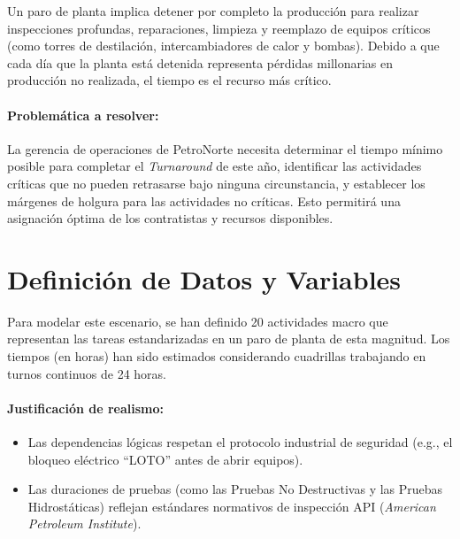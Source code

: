 \documentclass[11pt,a4paper]{article}
\begin{document}
Un paro de planta implica detener por completo la producción para realizar inspecciones profundas, reparaciones, limpieza y reemplazo de equipos críticos (como torres de destilación, intercambiadores de calor y bombas). Debido a que cada día que la planta está detenida representa pérdidas millonarias en producción no realizada, el tiempo es el recurso más crítico.

\paragraph{Problemática a resolver:}
La gerencia de operaciones de PetroNorte necesita determinar el tiempo mínimo posible para completar el \textit{Turnaround} de este año, identificar las actividades críticas que no pueden retrasarse bajo ninguna circunstancia, y establecer los márgenes de holgura para las actividades no críticas. Esto permitirá una asignación óptima de los contratistas y recursos disponibles.

\section{Definición de Datos y Variables}

Para modelar este escenario, se han definido 20 actividades macro que representan las tareas estandarizadas en un paro de planta de esta magnitud. Los tiempos (en horas) han sido estimados considerando cuadrillas trabajando en turnos continuos de 24 horas.

\paragraph{Justificación de realismo:}
\begin{itemize}
    \item Las dependencias lógicas respetan el protocolo industrial de seguridad (e.g., el bloqueo eléctrico ``LOTO'' antes de abrir equipos).
    \item Las duraciones de pruebas (como las Pruebas No Destructivas y las Pruebas Hidrostáticas) reflejan estándares normativos de inspección API (\textit{American Petroleum Institute}).
\end{itemize}
\end{document}
